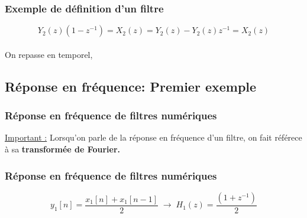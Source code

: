\documentclass{beamer}
\begin{document}
\begin{frame}
\frametitle{Exemple de définition d'un filtre}
\[ Y_2(z)(1 - z^{-1})  = X_2(z)  = Y_2(z) - Y_2(z)z^{-1} = X_2(z) \]\\
\vspace{0.3cm} 
On repasse en temporel,
\\
\vspace{0.2cm}


\vspace{0.3cm}

\end{frame}

\subsection{Réponse en fréquence: Premier exemple}
\begin{frame}
\frametitle{Réponse en fréquence de filtres numériques}
\underline{Important :} Lorsqu'on parle de la réponse en fréquence d'un filtre, on fait référece à sa \textbf{transformée de Fourier.}\\
\vspace{0.3cm}


\vspace{0.4cm}
\end{frame}

\begin{frame}
\frametitle{Réponse en fréquence de filtres numériques} 
\[ y_1[n] = \frac{x_1[n] + x_1[n-1]}{2}  \; \rightarrow \; H_1(z) = \frac{(1 + z^{-1})}{2} \]

\vspace{0.3cm}
\vspace{0.3cm}

\vspace{0.3cm}
\end{frame}
\end{document}
